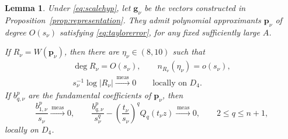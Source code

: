 \documentclass[12pt,letterpaper,reqno]{amsart}
\newtheorem{lem}[thm]{Lemma}
\theoremstyle{definition}
\numberwithin{equation}{section}
\newcommand{\convmeas}{\xrightarrow{\,\mathrm{meas}\,}}
\newcommand{\gv}{\bm g}
\newcommand{\pv}{\bm p}
\begin{document}
\begin{lem}\label{lem:replacement}
Under \eqref{eq:scalehyp}, let \(\gv_\nu\) be the vectors constructed
in Proposition~\ref{prop:representation}. They admit polynomial
approximants \(\pv_\nu\) of degree \(O(s_\nu)\) satisfying
\eqref{eq:taylorerror}, for any fixed sufficiently large \(A\).

If \(R_\nu=W(\pv_\nu)\), then there are
\(\eta_\nu\in(8,10)\) such that
\begin{equation}\label{eq:replacement-data}
 \begin{gathered}
 \deg R_\nu=O(s_\nu),
 \qquad
 n_{R_\nu}(\eta_\nu)=o(s_\nu),\\
 s_\nu^{-1}\log|R_\nu|
 \convmeas0
 \qquad\text{locally on }D_4.
 \end{gathered}
\end{equation}
If \(b_{q,\nu}^p\) are the fundamental coefficients of \(\pv_\nu\),
then
\begin{equation}\label{eq:polynomial-coefficients}
 \frac{b_{1,\nu}^p}{s_\nu}
 \convmeas0,
 \qquad
 \frac{b_{q,\nu}^p}{s_\nu^q}
 -
 \left(\frac{t_\nu}{s_\nu}\right)^qQ_q(t_\nu z)
 \convmeas0,
 \qquad
 2\leq q\leq n+1,
\end{equation}
locally on \(D_4\).
\end{lem}
\end{document}
